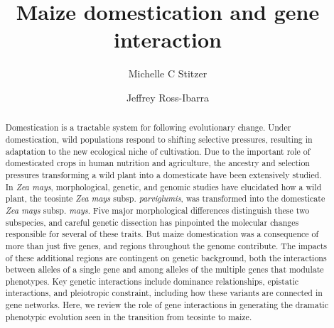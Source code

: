 \documentclass[9pt,twocolumn,twoside]{rilabRxiv}
\title{Maize domestication and gene interaction}
\author[$\ast$,1]{Michelle C Stitzer}
\author[$\ast,\dagger$]{Jeffrey Ross-Ibarra}
\affil[$\ast$]{Dept. of Plant Sciences and Center for Population Biology, University of California, Davis, CA, USA}
\affil[$\dagger$]{Genome Center, University of California, Davis, CA, USA}
\begin{document}
\maketitle




﻿\begin{abstract}
﻿Domestication is a tractable system for following evolutionary change.
Under domestication, wild populations respond to shifting selective pressures, resulting in adaptation to the new ecological niche of cultivation.
Due to the important role of domesticated crops in human nutrition and agriculture, the ancestry and selection pressures transforming a wild plant into a domesticate have been extensively studied.
In \textit{Zea mays}, morphological, genetic, and genomic studies have elucidated how a wild plant, the teosinte \textit{Zea mays} subsp. \textit{parviglumis}, was transformed into the domesticate \textit{Zea mays} subsp. \textit{mays}.
Five major morphological differences distinguish these two subspecies, and careful genetic dissection  has pinpointed the molecular changes responsible for several of these traits.
But maize domestication was a consequence of more than just five genes, and regions throughout the genome contribute.
The impacts of these additional regions are contingent on genetic background, both the interactions between alleles of a single gene and among alleles of the multiple genes that modulate phenotypes.
Key genetic interactions include dominance relationships, epistatic interactions, and pleiotropic constraint, including how these variants are connected in gene networks.
Here, we review the role of gene interactions in generating the dramatic phenotypic evolution seen in the transition from teosinte to maize.
\end{abstract}
\end{document}
